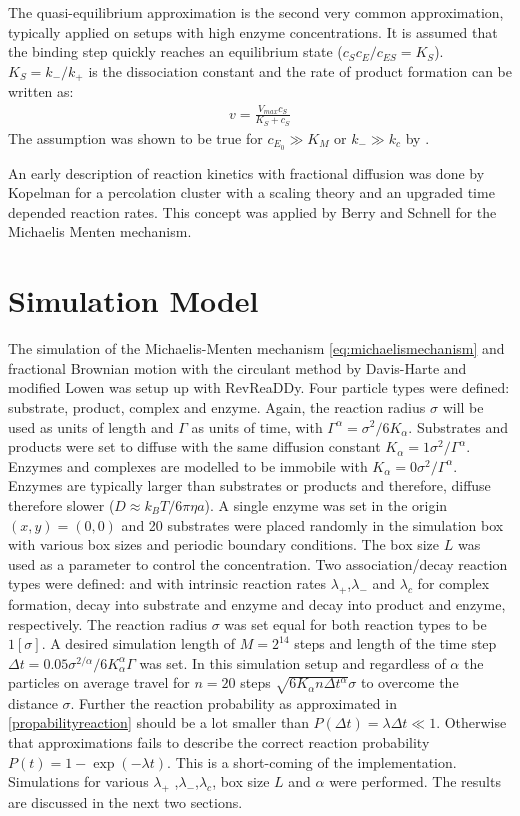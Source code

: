 \documentclass[
  a4paper,BCOR10mm,oneside,
  headsepline,footsepline,%
  fleqn,openbib
]{scrbook}
\begin{document}
The quasi-equilibrium approximation is the second very common approximation, typically applied on setups with high enzyme concentrations. It is assumed that the binding step quickly reaches an equilibrium state ($c_S c_E/c_{ES}=K_S$). $K_S=k_-/k_+$ is the dissociation constant and the rate of product formation can be written as:
\begin{align}
 v={\frac{V_{max} c_S}{K_S+ c_S}}
\end{align}
The assumption was shown to be true for $c_{E_0}\gg K_M \text{ or } k_- \gg k_c$ by \citet{Palsson1987}.\par  An early description of reaction kinetics with fractional diffusion was done by Kopelman \cite{Kopelman1988} for a percolation cluster with a scaling theory and an upgraded time depended reaction rates. This concept was applied by Berry \cite{Berry2002} and Schnell \cite{Schnell2004} for the Michaelis Menten mechanism.
\section{Simulation Model}
The simulation of the Michaelis-Menten mechanism \cref{eq:michaelismechanism} and fractional Brownian motion with the circulant method by Davis-Harte \cite{Dieker2004} and modified Lowen was setup up with RevReaDDy. Four particle types were defined: substrate, product, complex and enzyme. Again, the reaction radius $\sigma$ will be used as units of length and  $\Gamma$ as units of time, with $\Gamma^{\alpha}=\sigma^2/6 K_{\alpha} $.   Substrates and products were set to diffuse with the same diffusion constant $K_{\alpha}=1 \sigma^2 / \Gamma^{\alpha} $. Enzymes and complexes are modelled to be immobile with $K_{\alpha}= 0 \sigma^2 / \Gamma^{\alpha} $. Enzymes are typically larger than substrates or products and therefore, diffuse therefore slower ($D\approx k_B T/6 \pi \eta a$).  A single enzyme was set in the origin $(x,y)=(0,0)$ and 20 substrates were placed randomly in the simulation box with various box sizes and periodic boundary conditions. The box size $L$ was used as a parameter to control the concentration. Two association/decay reaction types were defined:   and  with intrinsic reaction rates $\lambda_+$,$\lambda_-$ and $\lambda_c$ for complex formation, decay into substrate and enzyme and decay into product and enzyme, respectively. The reaction radius $\sigma$ was set equal for both reaction types to be $1 [\sigma]$. A desired simulation length of $M=2^{14}$ steps and length of the time step $\Delta t=0.05 \sigma^{2/\alpha}/6 K_{\alpha}^{\alpha} \Gamma $ was set. In this simulation setup and regardless of $\alpha$ the particles on average travel for $n=20$ steps $\sqrt{6K_{\alpha} n \Delta t^{\alpha}} \sigma$ to overcome the distance $\sigma$. Further the reaction probability  as approximated in \cref{propabilityreaction} should be a lot smaller than  $P(\Delta t)=\lambda \Delta t \ll 1$. Otherwise that approximations fails to describe the correct reaction probability $P(t)=1-\exp(-\lambda t)$. This is a short-coming of the implementation. Simulations for various $\lambda_+$ ,$\lambda_-$,$\lambda_c$, box size $L$ and $\alpha$ were performed. The results are discussed in the next two sections. 
\end{document}

